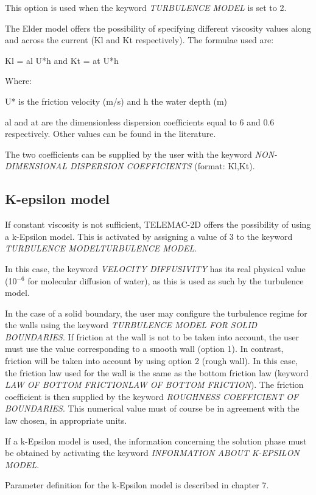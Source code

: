  This option is used when the keyword \textit{TURBULENCE MODEL} is set to 2.

 The Elder model offers the possibility of specifying different viscosity values along and across the current (Kl and Kt respectively). The formulae used are:

  Kl = al U*h and  Kt = at U*h

 Where:

 U* is the friction velocity (m/s) and h the water depth (m)

 al and at are the dimensionless dispersion coefficients equal to 6 and 0.6 respectively. Other values can be found in the literature.

 The two coefficients can be supplied by the user with the keyword \textit{NON-DIMENSIONAL DISPERSION COEFFICIENTS} (format: Kl,Kt).


\subsection{ K-epsilon model}

 If constant viscosity is not sufficient, TELEMAC-2D offers the possibility of using a k-Epsilon model. This is activated by assigning a value of 3 to the keyword \textit{TURBULENCE MODELTURBULENCE MODEL}.

 In this case, the keyword \textit{VELOCITY DIFFUSIVITY} has its real physical value (10${}^{-6}$ for molecular diffusion of water), as this is used as such by the turbulence model.

 In the case of a solid boundary, the user may configure the turbulence regime for the walls using the keyword \textit{TURBULENCE MODEL FOR SOLID BOUNDARIES}. If friction at the wall is not to be taken into account, the user must use the value corresponding to a smooth wall (option 1). In contrast, friction will be taken into account by using option 2 (rough wall). In this case, the friction law used for the wall is the same as the bottom friction law (keyword \textit{LAW OF BOTTOM FRICTIONLAW OF BOTTOM FRICTION}). The friction coefficient is then supplied by the keyword \textit{ROUGHNESS COEFFICIENT OF BOUNDARIES}. This numerical value must of course be in agreement with the law chosen, in appropriate units.

 If a k-Epsilon model is used, the information concerning the solution phase must be obtained by activating the keyword \textit{INFORMATION ABOUT K-EPSILON MODEL}.

 Parameter definition for the k-Epsilon model is described in chapter 7.


